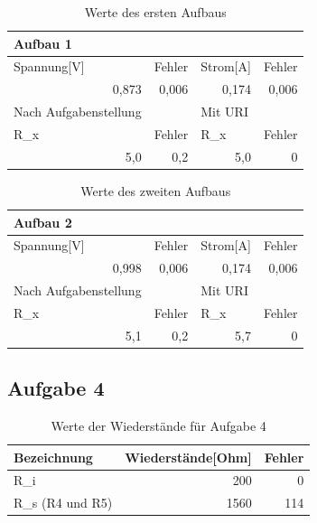 \documentclass[12pt]{scrartcl}
\begin{document}
\begin{table}[htbp]
\caption{Werte des ersten Aufbaus}
\begin{tabular}{|l|l|l|l|}
\hline
Aufbau 1 &  &  &  \\ \hline
Spannung[V] & Fehler & Strom[A] & Fehler \\ \hline
\multicolumn{1}{|r|}{0,873} & \multicolumn{1}{r|}{0,006} & \multicolumn{1}{r|}{0,174} & \multicolumn{1}{r|}{0,006} \\ \hline
Nach Aufgabenstellung &  & Mit URI &  \\ \hline
R\_x & Fehler & R\_x & Fehler \\ \hline
\multicolumn{1}{|r|}{5,0} & \multicolumn{1}{r|}{0,2} & \multicolumn{1}{r|}{5,0} & \multicolumn{1}{r|}{0} \\ \hline
\end{tabular}
\label{aufgabe_3_aufbau_1}
\end{table}

\begin{table}[htbp]
\caption{Werte des zweiten Aufbaus}
\begin{tabular}{|l|l|l|l|}
\hline
Aufbau 2 &  &  &  \\ \hline
Spannung[V] & Fehler & Strom[A] & Fehler \\ \hline
\multicolumn{1}{|r|}{0,998} & \multicolumn{1}{r|}{0,006} & \multicolumn{1}{r|}{0,174} & \multicolumn{1}{r|}{0,006} \\ \hline
Nach Aufgabenstellung &  & Mit URI &  \\ \hline
R\_x & Fehler & R\_x & Fehler \\ \hline
\multicolumn{1}{|r|}{5,1} & \multicolumn{1}{r|}{0,2} & \multicolumn{1}{r|}{5,7} & \multicolumn{1}{r|}{0} \\ \hline
\end{tabular}
\label{aufgabe_3_aufbau_2}
\end{table}

\newpage

\subsection{Aufgabe 4}

\begin{table}[htbp]
\caption{Werte der Wiederstände für Aufgabe 4}
\begin{tabular}{|l|r|r|}
\hline
Bezeichnung & \multicolumn{1}{l|}{Wiederstände[Ohm]} & \multicolumn{1}{l|}{Fehler} \\ \hline
R\_i & 200 & 0 \\ \hline
R\_s (R4 und R5) & 1560 & 114 \\ \hline
\end{tabular}
\label{aufgabe_4_wiederstände}
\end{table}
\end{document}
